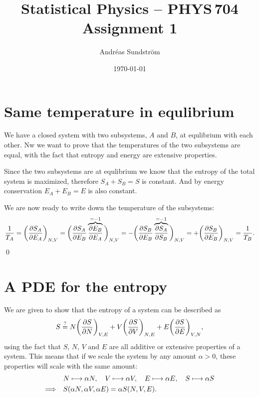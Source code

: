 \documentclass[11pt,letter, swedish, english
]{article}
\begin{document}
\title{Statistical Physics -- PHYS\,704 \\
Assignment 1}
\author{Andréas Sundström}
\date{\today}

\maketitle



\section{Same temperature in equlibrium}
We have a closed system with two subsystems, $A$ and $B$, at
equlibrium with each other. Nw we want to prove that the temperatures
of the two subsystems are equal, with the fact that entropy and energy
are extensive properties. 

Since the two subsystems are at equlibrium we know that the entropy of
the total system is maximized, therefore $S_A+S_B=S$ is constant. And
by energy conservation $E_A+E_B=E$ is also constant. 

We are now ready to write down the temperature of the subsystems:
\begin{equation}
\frac{1}{T_A}=\qty(\pdv{S_A}{E_A})_{N,V} 
=\bigg(\pdv{S_A}{E_B}\overbrace{\pdv{E_B}{E_A}}^{=-1}\bigg)_{N,V} 
=-\bigg(\pdv{S_B}{E_B}\overbrace{\pdv{S_A}{S_B}}^{=-1}\bigg)_{N,V} 
=+\qty(\pdv{S_B}{E_B})_{N,V} = \frac{1}{T_B}.
\end{equation}
\qed

\section{A PDE for the entropy}
We are given to show that the entropy of a system can be described as
\begin{equation}
S \stackrel{?}{=} N\qty(\pdv{S}{N})_{V,E} 
+ V\qty(\pdv{S}{V})_{N,E}
+ E\qty(\pdv{S}{E})_{V,N},
\end{equation}
using the fact that $S$, $N$, $V$ and $E$ are all additive or
extensive properties of a system. This means that if we scale the
system by any amount $\alpha>0$, these properties will scale with the
same amount:
\begin{align}
&N\longmapsto\alpha N\qcomma V\longmapsto \alpha V 
\qcomma E\longmapsto \alpha E\qcomma S\longmapsto \alpha S\\
\label{eq:scale_S}
\Longrightarrow\quad& S(\alpha N, \alpha V, \alpha E) = \alpha S(N, V, E).
\end{align}
\end{document}
